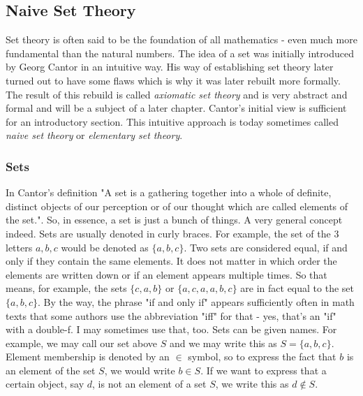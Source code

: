 

\subsection{Naive Set Theory}
\label{Sec:NaiveSetTheory}
Set theory is often said to be the foundation of all mathematics - even much more fundamental than the natural numbers. The idea of a set was initially introduced by Georg Cantor in an intuitive way. His way of establishing set theory later turned out to have some flaws which is why it was later rebuilt more formally. The result of this rebuild is called \emph{axiomatic set theory} and is very abstract and formal and will be a subject of a later chapter.  Cantor's initial view is sufficient for an introductory section. This intuitive approach is today sometimes called \emph{naive set theory} or \emph{elementary set theory}.



\subsubsection{Sets}
In Cantor's definition "A set is a gathering together into a whole of definite, distinct objects of our perception or of our thought which are called elements of the set.". So, in essence, a set is just a bunch of things. A very general concept indeed. Sets are usually denoted in curly braces. For example, the set of the 3 letters $a,b,c$ would be denoted as $\{a,b,c\}$. Two sets are considered equal, if and only if they contain the same elements. It does not matter in which order the elements are written down or if an element appears multiple times. So that means, for example, the sets $\{c,a,b\}$ or $\{a,c,a,a,b,c\}$ are in fact equal to the set $\{a,b,c\}$. By the way, the phrase "if and only if" appears sufficiently often in math texts that some authors use the abbreviation "iff" for that - yes, that's an "if" with a double-f. I may sometimes use that, too. Sets can be given names. For example, we may call our set above $S$ and we may write this as $S = \{a,b,c\}$. Element membership is denoted by an $\in$ symbol, so to express the fact that $b$ is an element of the set $S$, we would write $b \in S$. If we want to express that a certain object, say $d$, is not an element of a set $S$, we write this as $d \notin S$.

